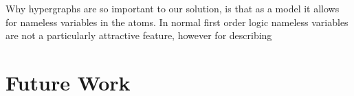 \documentclass[Master.tex]{subfiles}
\begin{document}
	Why hypergraphs are so important to our solution, is that as a model it allows for nameless variables in the atoms. 
	In normal first order logic nameless variables are not a particularly attractive feature, 
	however for describing 

	\section{Future Work}
	
	
	
\end{document}
